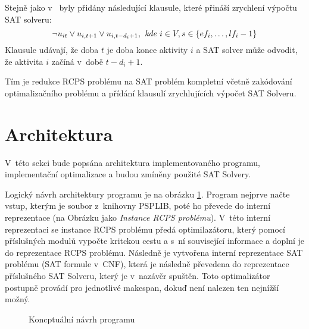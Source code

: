 \documentclass[a4paper, 12pt]{article}
\begin{document}
Stejně jako v~\cite{horbach:10} byly přidány následující klausule, které přináší zrychlení výpočtu SAT solveru:
\begin{equation}
\label{eq:6}
   \neg u_{it} \vee u_{i,t+1} \vee u_{i,t-d_i+1},\emph{ kde } i\in V, s\in\{ef_i,\ldots,lf_i-1\}  
\end{equation}
Klausule udávají, že doba $t$ je doba konce aktivity $i$ a SAT solver může odvodit, že aktivita $i$ začíná v~době
$t-d_i+1$.

Tím je redukce RCPS problému na SAT problém kompletní včetně zakódování optimalizačního problému a přídání
klausulí zrychlujících výpočet SAT Solveru.

\section{Architektura}
\label{sec:arch}
V~této sekci bude popsána architektura implementovaného programu, implementační optimalizace a budou zmíněny použité SAT Solvery.

Logický návrh architektury programu je na obrázku \ref{fig:arch}.
Program nejprve načte vstup, kterým je soubor z~knihovny PSPLIB, poté ho
převede do interní reprezentace (na Obrázku jako \emph{Instance RCPS problému}).
V~této interní reprezentaci se instance RCPS problému předá optimilazátoru,
který pomocí příslušných modulů vypočte kritckou cestu a s~ní související informace a doplní je do reprezentace RCPS problému.
Následně je vytvořena interní reprezentace SAT problému (SAT formule v~CNF), která je následně
převedena do reprezentace příslušného SAT Solveru, který je v~nazávěr spuštěn.
Toto optimalizátor postupně provádí pro jednotlivé makespan, dokuď není nalezen ten nejnížší možný.
\begin{figure}
\begin{center}
    
    \caption{Koncptuální návrh programu}
    \label{fig:arch}
\end{center}
\end{figure}
\end{document}
